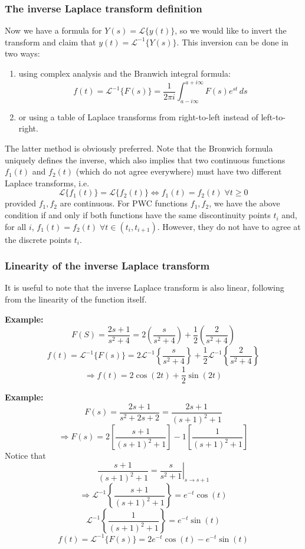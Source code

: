 \documentclass[11pt]{article}
\newcommand{\example}{\textbf{Example: }}
\newcommand{\lap}{\mathcal{L}}
\newcommand{\lapi}{\lap^{-1}}
\begin{document}
\subsubsection{The inverse Laplace transform definition}
	Now we have a formula for $Y(s) = \lap\{y(t)\}$, so we would like to invert the transform and claim that $y(t) = \lapi\{Y(s)\}$. This inversion can be done in two ways:
		\begin{enumerate}
			\item using complex analysis and the Branwich integral formula:
				$$ f(t) = \lapi\{F(s)\} = \frac{1}{2\pi i} \int_{a - i \infty}^{a + i \infty} F(s) e^{st} \,ds $$
			\item or using a table of Laplace transforms from right-to-left instead of left-to-right.
		\end{enumerate}
	The latter method is obviously preferred. Note that the Bronwich formula uniquely defines the inverse, which also implies that two continuous functions $f_1 (t)$ and $f_2(t)$ (which do not agree everywhere) must have two different Laplace transforms, i.e.
		$$ \lap\{f_1(t)\} = \lap\{f_2 (t)\} \Leftrightarrow f_1 (t) = f_2 (t) \; \forall t \geq 0 $$
	provided $f_1, f_2$ are continuous. For PWC functions $f_1, f_2$, we have the above condition if and only if both functions have the same discontinuity points $t_i$ and, for all $i$, $f_1 (t) = f_2 (t) \; \forall t \in (t_i, t_{i+1})$. However, they do not have to agree at the discrete points $t_i$.

\subsubsection{Linearity of the inverse Laplace transform}

	It is useful to note that the inverse Laplace transform is also linear, following from the linearity of the function itself.

	\example
		$$ F(S) = \frac{2s + 1}{s^2 + 4} = 2 \left(\frac{s}{s^2 + 4}\right) + \frac{1}{2} \left(\frac{2}{s^2 + 4}\right) $$
		$$ f(t) = \lapi\{F(s)\} = 2 \lapi \left\{\frac{s}{s^2+4} \right\} + \frac{1}{2} \lapi \left\{ \frac{2}{s^2+4} \right\} $$
		$$ \Rightarrow f(t) = 2 \cos(2t) + \frac{1}{2} \sin(2t) $$

	\example
		$$ F(s) = \frac{2s+1}{s^2 + 2s + 2} = \frac{2s+1}{(s+1)^2 + 1} $$
		$$ \Rightarrow F(s) = 2 \left[\frac{s+1}{(s+1)^2 + 1}\right] - 1 \left[\frac{1}{(s+1)^2 + 1}\right] $$
	Notice that
		$$ \frac{s+1}{(s+1)^2 + 1} = \left.\frac{s}{s^2 + 1}\right|_{s \to s+1} $$
		$$ \Rightarrow \lapi \left\{ \frac{s+1}{(s+1)^2 + 1} \right\} = e^{-t} \cos(t) $$
		$$ \lapi \left\{ \frac{1}{(s+1)^2 + 1} \right\} = e^{-t} \sin(t) $$
		$$ f(t) = \lapi \{F(s)\} = 2 e^{-t} \cos(t) - e^{-t} \sin(t) $$
\end{document}
